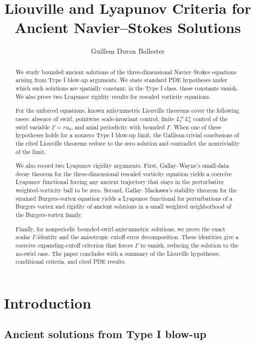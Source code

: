 \documentclass[11pt]{amsart}
\title[Ancient Navier--Stokes criteria]
{Liouville and Lyapunov Criteria for Ancient Navier--Stokes Solutions}
\author{Guillem Duran Ballester}
\date{}
\theoremstyle{plain}
\theoremstyle{definition}
\theoremstyle{remark}
\numberwithin{equation}{section}
\begin{document}
\begin{abstract}
We study bounded ancient solutions of the three-dimensional Navier--Stokes
equations arising from Type I blow-up arguments.  We state standard PDE
hypotheses under which such solutions are spatially constant; in the Type I
class, these constants vanish.  We also prove two Lyapunov rigidity results
for rescaled vorticity equations.

For the unforced equations, known axisymmetric Liouville theorems cover the
following cases: absence of swirl, pointwise scale-invariant control, finite
\(L_t^\infty L_x^p\) control of the swirl variable \(\Gamma=ru_\theta\), and
axial periodicity with bounded \(\Gamma\).  When one of these hypotheses holds
for a nonzero Type I blow-up limit, the Galilean-trivial conclusions of the
cited Liouville theorems reduce to the zero solution and contradict the
nontriviality of the limit.

We also record two Lyapunov rigidity arguments.  First, Gallay--Wayne's
small-data decay theorem for the three-dimensional rescaled vorticity equation
yields a coercive Lyapunov functional forcing any ancient trajectory that stays
in the perturbative weighted-vorticity ball to be zero.  Second,
Gallay--Maekawa's stability theorem for the strained Burgers-vortex equation
yields a Lyapunov functional for perturbations of a Burgers vortex and
rigidity of ancient solutions in a small weighted neighborhood of the
Burgers-vortex family.

Finally, for nonperiodic bounded-swirl axisymmetric solutions, we prove the
exact scalar \(\Gamma\)-identity and the anisotropic cutoff-error
decomposition.  These identities give a coercive expanding-cutoff criterion
that forces \(\Gamma\) to vanish, reducing the solution to the no-swirl case.
The paper concludes with a summary of the Liouville hypotheses, conditional
criteria, and cited PDE results.
\end{abstract}

\maketitle

\section{Introduction}

\subsection{Ancient solutions from Type I blow-up}
\end{document}
